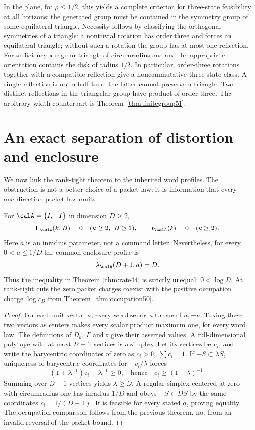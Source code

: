 In the plane, for $\rho\le1/2$, this yields a complete criterion for
three-state feasibility at all horizons: the generated group must be
contained in the symmetry group of some equilateral triangle. Necessity
follows by classifying the orthogonal symmetries of a triangle: a
nontrivial rotation has order three and forces an equilateral triangle;
without such a rotation the group has at most one reflection. For
sufficiency a regular triangle of circumradius one and the appropriate
orientation contains the disk of radius $1/2$. In particular, order-three
rotations together with a compatible reflection give a noncommutative
three-state class. A single reflection is not a half-turn: the latter cannot preserve a triangle. Two distinct reflections in the triangular group have product of order three. The arbitrary-width counterpart is Theorem~\ref{thm:finitegroup51}.

\section{An exact separation of distortion and enclosure}\label{sec:separation50}
We now link the rank-tight theorem to the inherited word profiles.
The obstruction is not a better choice of a packet law: it is information
that every one-direction packet law omits.

\begin{theorem}\label{thm:separation50}
For $\calA=\{I,-I\}$ in dimension $D\ge2$,
\[
 \Gamma_{\calA}(k,B)=0\quad(k\ge2,\ B\ge1),\qquad
 \mathfrak r_{\calA}(k)=0\quad(k\ge2).
\]
Here $a$ is an inradius parameter, not a command letter. Nevertheless, for every $0<a\le1/D$ the common enclosure profile is
\begin{equation}\label{eq:lambda50}
 \lambda_{\calA}(D+1,a)=D.
\end{equation}
Thus the inequality in Theorem~\ref{thm:rate44} is strictly unequal:
$0<\log D$. At rank-tight cuts the zero packet charges coexist with
the positive occupation charge $\log c_D$ from
Theorem~\ref{thm:occupation50}.
\end{theorem}
\begin{proof}
For each unit vector $u$, every word sends $u$ to one of $u,-u$.
Taking these two vectors as centers makes every scalar product maximum
one, for every word law. The definitions of $D_k$, $\Gamma$ and
$\mathfrak r$ give their asserted values.
A full-dimensional polytope with at most $D+1$ vertices is a simplex.
Let its vertices be $v_i$, and write the barycentric coordinates of
zero as $c_i>0$, $\sum c_i=1$. If $-S\subset\lambda S$, uniqueness of
barycentric coordinates for $-v_i/\lambda$ forces
\[
 (1+\lambda^{-1})c_i-\lambda^{-1}\ge0,
 \quad\text{hence}\quad c_i\ge(1+\lambda)^{-1}.
\]
Summing over $D+1$ vertices yields $\lambda\ge D$. A regular simplex
centered at zero with circumradius one has inradius $1/D$ and obeys
$-S\subset D S$ by the same coordinates $c_i=1/(D+1)$.
It is feasible for every stated $a$, proving equality. The occupation
comparison follows from the previous theorem, not from an invalid
reversal of the packet bound.
\end{proof}

